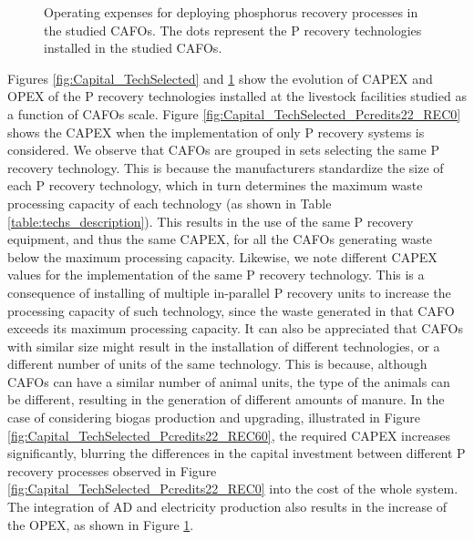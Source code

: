 \begin{refsection}[referencesCh4]
\begin{figure}[h!]
	\caption{Operating expenses for deploying phosphorus recovery processes in the studied CAFOs. The dots represent the P recovery technologies installed in the studied CAFOs.}
	\label{fig:OPEX_TechSelected}
\end{figure}

Figures \ref{fig:Capital_TechSelected} and \ref{fig:OPEX_TechSelected} show the evolution of CAPEX and OPEX of the P recovery technologies installed at the livestock facilities studied as a function of CAFOs scale. Figure \ref{fig:Capital_TechSelected_Pcredits22_REC0} shows the CAPEX when the implementation of only P recovery systems is considered. We observe that CAFOs are grouped in sets selecting the same P recovery technology. This is because the manufacturers standardize the size of each P recovery technology, which in turn determines the maximum waste processing capacity of each technology (as shown in Table \ref{table:techs_description}). This results in the use of the same P recovery equipment, and thus the same CAPEX, for all the CAFOs generating waste below the maximum processing capacity. Likewise, we note different CAPEX values for the implementation of the same P recovery technology. This is a consequence of installing of multiple in-parallel P recovery units to increase the processing capacity of such technology, since the waste generated in that CAFO exceeds its maximum processing capacity. It can also be appreciated that CAFOs with similar size might result in the installation of different technologies, or a different number of units of the same technology.
This is because, although CAFOs can have a similar number of animal units, the type of the animals can be different, resulting in the generation of different amounts of manure. 
In the case of considering biogas production and upgrading, illustrated in Figure \ref{fig:Capital_TechSelected_Pcredits22_REC60}, the required CAPEX increases significantly, blurring the differences in the capital investment between different P recovery processes observed in Figure \ref{fig:Capital_TechSelected_Pcredits22_REC0} into the cost of the whole system. The integration of AD and electricity production also results in the increase of the OPEX, as shown in Figure \ref{fig:OPEX_TechSelected}.


\end{refsection}
